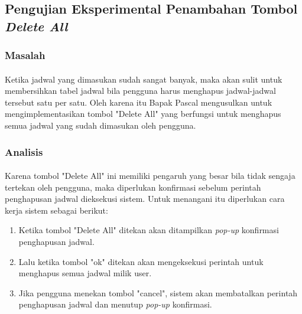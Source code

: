\subsection{Pengujian Eksperimental Penambahan Tombol \textit{Delete All}}
\subsubsection{Masalah}
\paragraph{}Ketika jadwal yang dimasukan sudah sangat banyak, maka akan sulit untuk membersihkan tabel jadwal bila pengguna harus menghapus jadwal-jadwal tersebut satu per satu. Oleh karena itu Bapak Pascal mengusulkan untuk mengimplementasikan tombol "Delete All" yang berfungsi untuk menghapus semua jadwal yang sudah dimasukan oleh pengguna. 

\subsubsection{Analisis}
\paragraph{}Karena tombol "Delete All" ini memiliki pengaruh yang besar bila tidak sengaja tertekan oleh pengguna, maka diperlukan konfirmasi sebelum perintah penghapusan jadwal dieksekusi sistem.\newline
Untuk menangani itu diperlukan cara kerja sistem sebagai berikut:
\begin{enumerate}
	\item Ketika tombol "Delete All" ditekan akan ditampilkan \textit{pop-up} konfirmasi penghapusan jadwal.
	\item Lalu ketika tombol "ok" ditekan akan mengeksekusi perintah untuk menghapus semua jadwal milik user.
	\item Jika pengguna menekan tombol "cancel", sistem akan membatalkan perintah penghapusan jadwal dan menutup \textit{pop-up} konfirmasi.
\end{enumerate}

